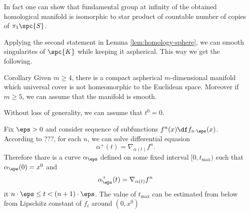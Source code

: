 In fact one can show that fundamental group at infinity
of the obtained homological manifold is isomorphic to 
star product of countable number of copies of $\pi_1\spc{S}$.

Applying the second statement in Lemma \ref{lem:homology-sphere},
we can smooth singularites of $\spc{K}$ while keeping it aspherical.
This way we get the following.

\begin{thm}{Corollary}
Given $m\ge 4$,
there is a compact aspherical $m$-dimensional manifold 
which universal cover is not homeomorphic to the Euclidean space.
Moreover if $m\ge 5$, we can assume that the manifold is smooth.
\end{thm}
























\newcommand*{\Lob}{\hbox{
\vcenter{\offinterlineskip
\hbox{\CYRL}%
\vskip-1.597ex\hskip-1.9ex\hbox{\color{white}$\mathbf{I}$}%
\vskip-1.597ex\hskip-1.9ex\hbox{$\II$}%
\vskip-.311ex\hskip-2.842ex\hbox{\tiny\color{white}.}}}}















Without loss of generality, we can assume that $t^0=0$.

Fix $\eps>0$ 
and consider sequence of subfunctions
$f^n(x)\df f_{n\cdot\eps}(x)$.
According to ???, for each $n$, we can solve differential equasion
$$\alpha^+(t)=\nabla_{\alpha(t)}f^n.$$
Therefore thare is a curve $\alpha_\eps$ defined on some fixed interval $[0,t_{\max})$
such that $\alpha_\eps(0)=x^0$ and
$$\alpha_\eps^+(t)= \nabla_{\alpha(t)}f^n$$
it $n\cdot\eps\le t<(n+1)\cdot\eps$.
The value of $t_{\max}$ can be estimated from below from Lipschitz constant of $f_t$ around $(0,x^0)$

\qeds















